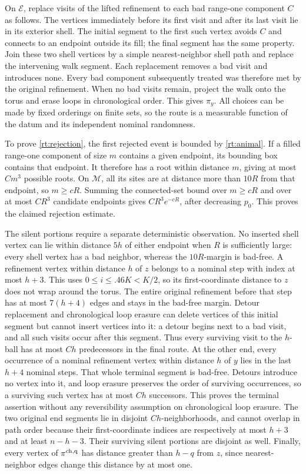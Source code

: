 On \(\mathcal E\), replace visits of the lifted refinement to each
bad range-one component \(C\) as follows.  The vertices immediately
before its first visit and after its last visit lie in its exterior
shell.  The initial segment to the first such vertex avoids \(C\)
and connects to an endpoint outside its fill; the final segment has the
same property.  Join these two shell vertices by a simple
nearest-neighbor shell path and replace the intervening walk segment.
Each replacement removes a bad visit and introduces none.  Every bad
component subsequently treated was therefore met by the original
refinement.  When no bad visits remain, project the walk onto the torus
and erase loops in chronological order.  This gives \(\pi_y\).
All choices can be made by fixed orderings on finite sets, so the route
is a measurable function of the datum and its independent nominal
randomness.

To prove \eqref{rt:rejection}, the first rejected event is bounded by
\eqref{rt:animal}.  If a filled range-one component of size \(m\)
contains a given endpoint, its bounding box contains that endpoint.
It therefore has a root within distance \(m\), giving at most
\(Cm^3\) possible roots.  On \(\mathcal M\), all its sites are at
distance more than \(10R\) from that endpoint, so \(m\ge cR\).
Summing the connected-set bound over \(m\ge cR\) and over at most
\(CR^3\) candidate endpoints gives \(CR^3e^{-cR}\), after decreasing
\(p_0\).  This proves the claimed rejection estimate.

The silent portions require a separate deterministic observation.
No inserted shell vertex can lie within distance \(5h\) of either
endpoint when \(R\) is sufficiently large: every shell vertex has a
bad neighbor, whereas the \(10R\)-margin is bad-free.  A refinement
vertex within distance \(h\) of \(z\) belongs to a nominal step with
index at most \(h+3\).  This uses \(0\le i\le .46K<K/2\), so its
first-coordinate distance to \(z\) does not wrap around the torus.
The entire original refinement before that step has at most
\(7(h+4)\) edges and stays in the bad-free margin.  Detour replacement
and chronological loop erasure can delete vertices of this initial
segment but cannot insert vertices into it: a detour begins next to
a bad visit, and all such visits occur after this segment.  Thus every
surviving visit to the \(h\)-ball has at most \(Ch\) predecessors in
the final route.  At the other end, every occurrence of a nominal
refinement vertex within distance \(h\) of \(y\) lies in the last
\(h+4\) nominal steps.  That whole terminal segment is bad-free.
Detours introduce no vertex into it, and loop erasure preserves the
order of surviving occurrences, so a surviving such vertex has at most
\(Ch\) successors.  This proves the terminal assertion without any
reversibility assumption on chronological loop erasure.  The two
original end segments lie in disjoint
\(Ch\)-neighborhoods, and cannot overlap in path order because their
first-coordinate indices are respectively at most \(h+3\) and at
least \(n-h-3\).  Their surviving silent portions are disjoint as well.
Finally, every vertex of \(\pi^{\rm ch,q}\) has distance greater
than \(h-q\) from \(z\), since nearest-neighbor edges change this
distance by at most one.


